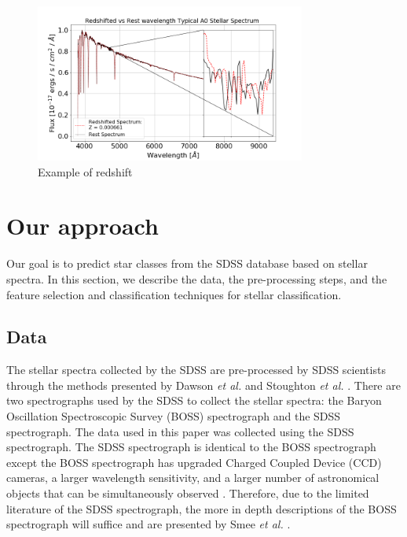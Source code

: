 \documentclass[conference]{IEEEtran}
\begin{document}
        \begin{figure}
            \centering
            \includegraphics[width=3.5in]{redshift.png}
            \caption{Example of redshift}
            \label{fig:redshift}
        \end{figure}

\section{Our approach}\label{sec:approach}

Our goal is to predict star classes from the SDSS database based on stellar spectra. In this section, we describe the data, the pre-processing steps, and the feature selection and classification techniques for stellar classification. 
		
	\subsection{Data}\label{sec:data}

	The stellar spectra collected by the SDSS are pre-processed by SDSS scientists through the methods presented by Dawson \textit{et al. }\cite{Dawson} and Stoughton \textit{et al.}  \cite{Stoughton}. There are two spectrographs used by the SDSS to collect the stellar spectra: the Baryon Oscillation Spectroscopic Survey (BOSS) spectrograph and the SDSS spectrograph. The data used in this paper was collected using the SDSS spectrograph. The SDSS spectrograph is identical to the BOSS spectrograph except the BOSS spectrograph has upgraded Charged Coupled Device (CCD) cameras, a larger wavelength sensitivity, and a larger number of astronomical objects that can be simultaneously observed \cite{boss}. Therefore, due to the limited literature of the SDSS spectrograph, the more in depth descriptions of the BOSS spectrograph will suffice and are presented by Smee \textit{et al.} \cite{Smee}.  
\end{document}
